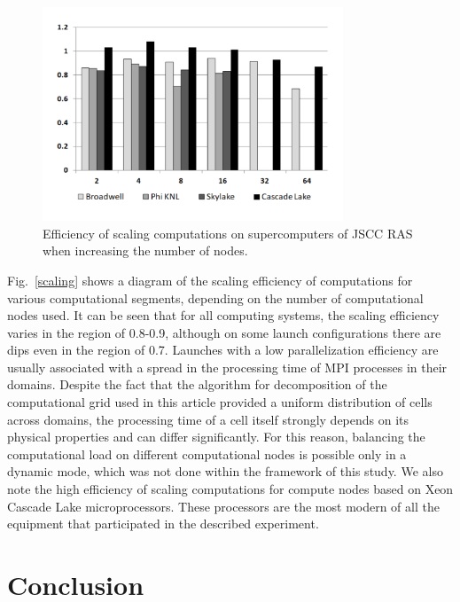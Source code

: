 \documentclass[
11pt,%
tightenlines,%
twoside,%
onecolumn,%
nofloats,%
nobibnotes,%
nofootinbib,%
superscriptaddress,%
noshowpacs,%
centertags]%
{revtex4}
\begin{document}
\begin{figure}[h]
\includegraphics[width=0.8\textwidth]{pics/scaling.pdf}
\caption{Efficiency of scaling computations on supercomputers of JSCC RAS when increasing the number of nodes.}\label{fig:speedup}
\end{figure}

Fig.~\ref{scaling} shows a diagram of the scaling efficiency of computations for various computational segments, depending on the number of computational nodes used.
It can be seen that for all computing systems, the scaling efficiency varies in the region of 0.8-0.9, although on some launch configurations there are dips even in the region of 0.7.
Launches with a low parallelization efficiency are usually associated with a spread in the processing time of MPI processes in their domains.
Despite the fact that the algorithm for decomposition of the computational grid used in this article provided a uniform distribution of cells across domains, the processing time of a cell itself strongly depends on its physical properties and can differ significantly.
For this reason, balancing the computational load on different computational nodes is possible only in a dynamic mode, which was not done within the framework of this study.
We also note the high efficiency of scaling computations for compute nodes based on Xeon Cascade Lake microprocessors.
These processors are the most modern of all the equipment that participated in the described experiment.

\section{Conclusion}
\end{document}
